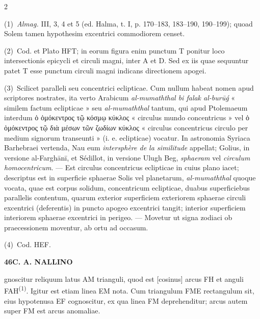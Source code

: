 \documentclass[10pt]{article}
\newcommand{\A}[1]{\hypertarget{#1}{}}
\newcommand{\NM}[1]{\textsuperscript{(#1)}}
\newcommand{\NN}[2]{\par\noindent\textup{(#1)}\ #2}
\newcommand{\GR}[1]{\textgreek{#1}}
\newcommand{\SP}[3]{%
  \clearpage
  \A{AB01-PDF#1}%
  \begin{center}\textbf{#2\quad #3}\end{center}%
}
\begin{document}
\begin{multicols}{2}
\footnotesize

\A{AB01-PDF0134-N01}
\NN{1}{\textit{Almag.} III, 3, 4 et 5
(ed. Halma, t. I, p. 170–183, 183–190, 190–199);
quoad Solem tamen hypothesim excentrici commodiorem censet.}

\A{AB01-PDF0134-N02}
\NN{2}{Cod. et Plato HFT; in eorum figura enim punctum T
ponitur loco intersectionis epicycli et circuli magni,
inter A et D. Sed ex iis quae sequuntur patet T esse punctum
circuli magni indicans directionem apogei.}

\A{AB01-PDF0134-N03}
\NN{3}{Scilicet paralleli seu concentrici eclipticae.
Cum nullum habeat nomen apud scriptores nostrates, ita verto
Arabicum \textit{al-mumaththal bi falak al-burūǵ}
« similem factum eclipticae » seu \textit{al-mumaththal}
tantum, qui apud Ptolemaeum interdum
\GR{ὁ ὁμόκεντρος τῷ κόσμῳ κύκλος}
« circulus mundo concentricus » vel
\GR{ὁ ὁμόκεντρος τῷ διὰ μέσων τῶν ζωδίων κύκλος}
« circulus concentricus circulo per medium signorum
transeunti » (i. e. eclipticae) vocatur. In astronomia
Syriaca Barhebraei vertenda, {\addfontfeatures{LetterSpace=0.5} Nau} eum
\textit{intersphère de la similitude} appellat; {\addfontfeatures{LetterSpace=0.5} Golius},
in versione al-Farghānī, et {\addfontfeatures{LetterSpace=0.5} Sédillot}, in versione Ulugh Beg,
\textit{sphaeram} vel \textit{circulum homocentricum}.
— Est circulus concentricus eclipticae in cuius plano iacet;
descriptus est in superficie sphaerae Solis vel planetarum,
\textit{al-mumaththal} quoque vocata, quae est corpus solidum,
concentricum eclipticae, duabus superficiebus parallelis
contentum, quarum exterior superficiem exteriorem sphaerae
circuli excentrici (deferentis) in puncto apogeo excentrici
tangit; interior superficiem interiorem sphaerae excentrici
in perigeo. — Movetur ut signa zodiaci ob praecessionem
moventur, ab ortu ad occasum.}

\A{AB01-PDF0134-N04}
\NN{4}{Cod. HEF.}

\end{multicols}


\SP{0135}{46}{C. A. NALLINO}

\A{AB01-PDF0135-P01}
gnoscitur reliquum latus AM trianguli, quod est [cosinus]
arcus FH et anguli FAH\NM{1}. Igitur est etiam linea EM nota.
Cum triangulum FME rectangulum sit, eius hypotenusa EF
cognoscitur, ex qua linea FM deprehenditur; arcus autem super
FM est arcus anomaliae.
\end{document}
